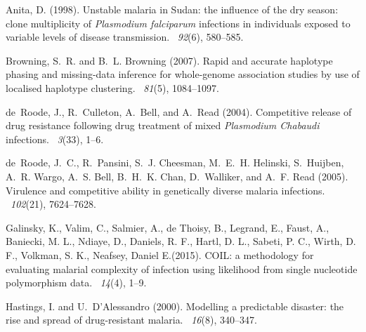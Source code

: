\documentclass{bioinfo}
\begin{document}
\begin{thebibliography}{}

Anita, D. (1998).
\newblock Unstable malaria in Sudan: the influence of the dry season: clone
  multiplicity of {\it Plasmodium falciparum} infections in individuals exposed to
  variable levels of disease transmission.
~{\em 92\/}(6), 580--585.

Browning, S.~R. and B.~L. Browning (2007).
\newblock Rapid and accurate haplotype phasing and missing-data inference for
  whole-genome association studies by use of localised haplotype clustering.
~{\em 81\/}(5), 1084--1097.

de~Roode, J., R.~Culleton, A.~Bell, and A.~Read (2004).
\newblock Competitive release of drug resistance following drug treatment of
  mixed {\it Plasmodium Chabaudi} infections.
~{\em 3\/}(33), 1--6.

de~Roode, J.~C., R.~Pansini, S.~J. Cheesman, M.~E.~H. Helinski, S.~Huijben,
  A.~R. Wargo, A.~S. Bell, B.~H.~K. Chan, D.~Walliker, and A.~F. Read (2005).
\newblock Virulence and competitive ability in genetically diverse malaria
  infections.
~{\em 102\/}(21), 7624--7628.

Galinsky, K., Valim, C., Salmier, A., de Thoisy, B., Legrand, E., Faust, A., Baniecki, M. L., Ndiaye, D., Daniels, R. F., Hartl, D. L., Sabeti, P. C., Wirth, D. F., Volkman, S. K., Neafsey, Daniel E.(2015).
\newblock COIL: a methodology for evaluating malarial complexity of infection using likelihood from single nucleotide polymorphism data.
~{\em14\/}(4), 1--9.

Hastings, I. and U.~D'Alessandro (2000).
\newblock Modelling a predictable disaster: the rise and spread of
  drug-resistant malaria.
~{\em 16\/}(8), 340--347.


\end{thebibliography}
\end{document}
